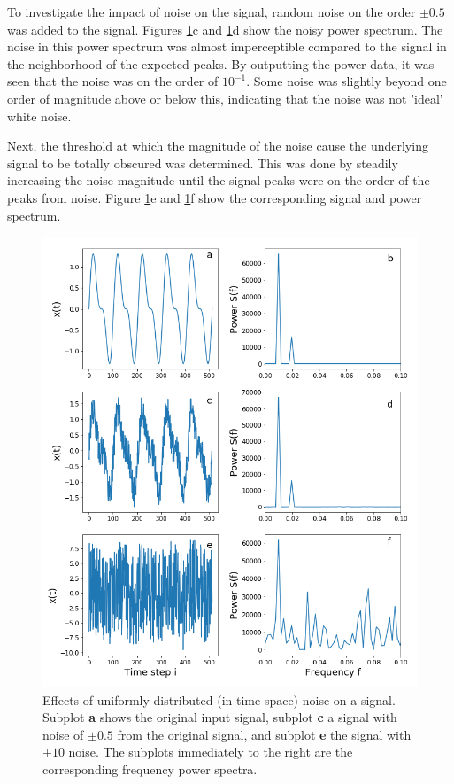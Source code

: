 \documentclass[twocolumn]{article}
\begin{document}
To investigate the impact of noise on the signal, random noise on the order $\pm 0.5$ was added to the signal. Figures \ref{fig:spectral_filter}c and \ref{fig:spectral_filter}d show the noisy power spectrum. The noise in this power spectrum was almost imperceptible compared to the signal in the neighborhood of the expected peaks. By outputting the power data, it was seen that the noise was on the order of $10^{-1}$. Some noise was slightly beyond one order of magnitude above or below this, indicating that the noise was not 'ideal' white noise.

Next, the threshold at which the magnitude of the noise cause the underlying signal to be totally obscured was determined. This was done by steadily increasing the noise magnitude until the signal peaks were on the order of the peaks from noise. Figure \ref{fig:spectral_filter}e and \ref{fig:spectral_filter}f show the corresponding signal and power spectrum.


\begin{figure}[t]
	\centering
	\includegraphics[height=\paperwidth]{spectral_filter}
	\caption{Effects of uniformly distributed (in time space) noise on a signal. Subplot \textbf{a} shows the original input signal, subplot \textbf{c} a signal with noise of $\pm0.5$ from the original signal, and subplot \textbf{e} the signal with $\pm10$ noise. The subplots immediately to the right are the corresponding frequency power spectra.}
	\label{fig:spectral_filter}
\end{figure}
\end{document}
